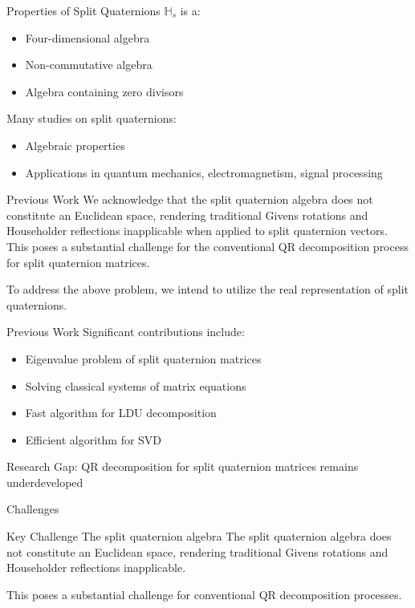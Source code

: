 \documentclass{beamer}
\begin{document}
\begin{frame}{Properties of Split Quaternions}
  $\mathbb{H}_s$ is a:
  \begin{itemize}
    \item Four-dimensional algebra
    \item Non-commutative algebra
    \item Algebra containing zero divisors
  \end{itemize}
  
  \vspace{1em}
  Many studies on split quaternions:
  \begin{itemize}
    \item Algebraic properties \cite{AR2020,Yasemin2012,TJiang2015,Jiang2018}
    \item Applications in quantum mechanics, electromagnetism, signal processing \cite{Gog2022, Hasebe2010}
  \end{itemize}
\end{frame}
\begin{frame}{Previous Work}
We acknowledge that the split quaternion algebra does not constitute an Euclidean space, rendering traditional Givens rotations and Householder reflections inapplicable when applied to split quaternion vectors. This poses a substantial challenge for the conventional QR decomposition process for split quaternion matrices.

To address the above problem, we intend to utilize the real representation of split quaternions.
\end{frame}

\begin{frame}{Previous Work}
  Significant contributions include:
  \begin{itemize}
    \item Eigenvalue problem of split quaternion matrices \cite{Jiang2018}
    \item Solving classical systems of matrix equations \cite{wang2024}
    \item Fast algorithm for LDU decomposition \cite{Wang2021}
    \item Efficient algorithm for SVD \cite{Gang2024}
  \end{itemize}
  
  \vspace{1em}
  \alert{Research Gap:} QR decomposition for split quaternion matrices remains underdeveloped
\end{frame}

\begin{frame}{Challenges}
  \begin{block}{Key Challenge}
    The split quaternion algebra
    The split quaternion algebra does not constitute an Euclidean space, rendering traditional Givens rotations and Householder reflections inapplicable.
  \end{block}
  
  This poses a substantial challenge for conventional QR decomposition processes.
\end{frame}
\end{document}
